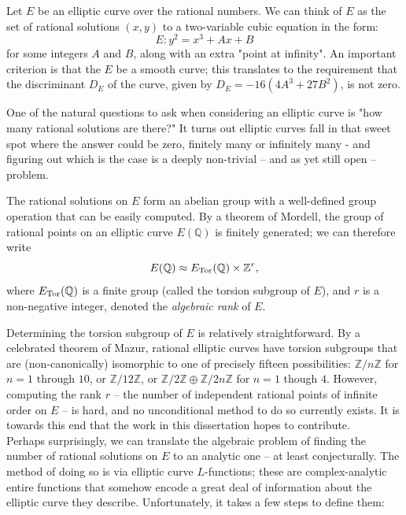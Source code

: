 
Let $E$ be an elliptic curve over the rational numbers. We can think of $E$ as the set of rational solutions $(x,y)$ to a two-variable cubic equation in the form:
\begin{equation}
E: y^2 = x^3 + Ax + B
\end{equation}
for some integers $A$ and $B$, along with an extra "point at infinity". An important criterion is that the $E$ be a smooth curve; this translates to the requirement that the discriminant $D_E$ of the curve, given by $D_E = -16(4A^3+27B^2)$, is not zero.

One of the natural questions to ask when considering an elliptic curve is "how many rational solutions are there?" It turns out elliptic curves fall in that sweet spot where the answer could be zero, finitely many or infinitely many - and figuring out which is the case is a deeply non-trivial -- and as yet still open -- problem.

The rational solutions on $E$ form an abelian group with a well-defined group operation that can be easily computed. By a theorem of Mordell, the group of rational points on an elliptic curve $E(\mathbb{Q})$ is finitely generated; we can therefore write
\begin{equation}
E(\mathbb{Q}) \approx E_{\text{Tor}}(\mathbb{Q}) \times \mathbb{Z}^r,
\end{equation}
where $E_{\text{Tor}}(\mathbb{Q})$ is a finite group (called the torsion subgroup of $E$), and $r$ is a non-negative integer, denoted the {\it algebraic rank} of $E$.

Determining the torsion subgroup of $E$ is relatively straightforward. By a celebrated theorem of Mazur, rational elliptic curves have torsion subgroups that are (non-canonically) isomorphic to one of precisely fifteen possibilities: $\mathbb{Z}/n\mathbb{Z}$ for $n = 1$ through $10$, or $\mathbb{Z}/12\mathbb{Z}$, or $\mathbb{Z}/2\mathbb{Z}\oplus \mathbb{Z}/2n\mathbb{Z}$ for $n = 1$ though $4$. However, computing the rank $r$ -- the number of independent rational points of infinite order on $E$ -- is hard, and no unconditional method to do so currently exists. It is towards this end that the work in this dissertation hopes to contribute. \\

Perhaps surprisingly, we can translate the algebraic problem of finding the number of rational solutions on $E$ to an analytic one -- at least conjecturally. The method of doing so is via elliptic curve $L$-functions; these are complex-analytic entire functions that somehow encode a great deal of information about the elliptic curve they describe. Unfortunately, it takes a few steps to define them:

